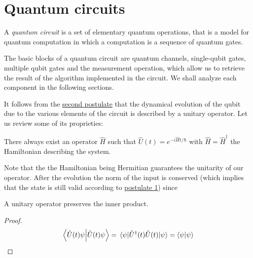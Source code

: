 \section{Quantum circuits}
A \emph{quantum circuit} is a set of elementary quantum operations, that is a model for quantum computation in which a computation is a sequence of quantum gates.

The basic blocks of a quantum circuit are quantum channels, single-qubit gates, multiple qubit gates and the measurement operation, which allow us to retrieve the result of the algorithm implemented in the circuit. We shall analyze each component in the following sections.

It follows from the \hyperref[postulate:2]{second postulate} that the dynamical evolution of the qubit due to the various elements of the circuit is described by a unitary operator. Let us review some of its proprieties: 
\begin{theorem}\label{theorem:1}
There always exist an operator $\hat{H}$ such that $\hat{U}(t) = e^{-i\hat{H}t/\hbar}$ with $\hat{H} = \hat{H}^\dagger$ the Hamiltonian describing the system. \cite[p.145]{Shankar}
\end{theorem}

Note that the the Hamiltonian being Hermitian guarantees the unitarity of our operator. After the evolution the norm of the input is conserved (which implies that the state is still valid according to \hyperref[postulate:1]{postulate 1}) since
\begin{theorem}
A unitary operator preserves the inner product.
\end{theorem}
\begin{proof}
\begin{equation*}
    \bra{\hat{U}(t)\psi}\ket{\hat{U}(t)\psi} = \expval{\hat{U}^\dagger(t)\hat{U}(t)}{\psi} = \braket{\psi}
\end{equation*}
\end{proof}

